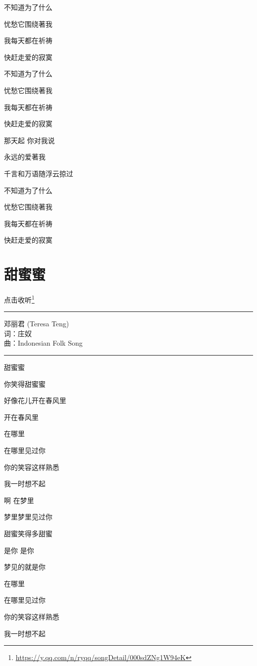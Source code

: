 \documentclass[]{ctexbook}
\renewcommand{\href}[2]{#2\footnote{\url{#1}}}
\begin{document}
不知道为了什么

忧愁它围绕著我

我每天都在祈祷

快赶走爱的寂寞

不知道为了什么

忧愁它围绕著我

我每天都在祈祷

快赶走爱的寂寞

那天起 你对我说

永远的爱著我

千言和万语随浮云掠过

不知道为了什么

忧愁它围绕著我

我每天都在祈祷

快赶走爱的寂寞

\section*{甜蜜蜜}\label{sweet}


\href{https://y.qq.com/n/ryqq/songDetail/000sdZNg1W94eK}{点击收听}

\begin{center}\rule{0.5\linewidth}{0.5pt}\end{center}

邓丽君 (Teresa Teng)\\
词：庄奴\\
曲：Indonesian Folk Song

\begin{center}\rule{0.5\linewidth}{0.5pt}\end{center}

甜蜜蜜

你笑得甜蜜蜜

好像花儿开在春风里

开在春风里

在哪里

在哪里见过你

你的笑容这样熟悉

我一时想不起

啊 在梦里

梦里梦里见过你

甜蜜笑得多甜蜜

是你 是你

梦见的就是你

在哪里

在哪里见过你

你的笑容这样熟悉

我一时想不起
\end{document}
